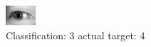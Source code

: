 \begin{figure}[h!]
\begin{center}
\includegraphics[width=0.60\columnwidth]{figures/ID3251_class_3_target_4.png}
\end{center}
\caption{ Classification: 3 actual target: 4}
\label{fig:ID3251_class_3_target_4}
\end{figure}

